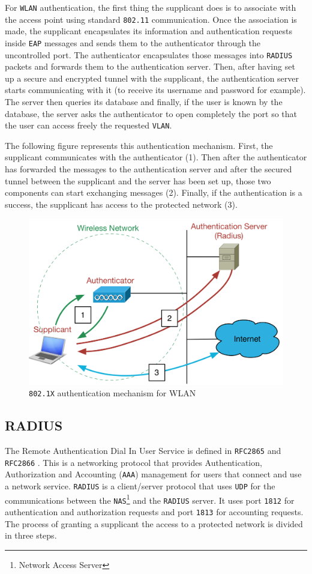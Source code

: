 For \texttt{WLAN} authentication, the first thing the supplicant does is to associate with the access point using standard \texttt{802.11} communication. Once the association is made, the supplicant encapsulates its information and authentication requests inside \texttt{EAP} messages and sends them to the authenticator through the uncontrolled port. The authenticator encapsulates those messages into \texttt{RADIUS} packets and forwards them to the authentication server. Then, after having set up a secure and encrypted tunnel with the supplicant, the authentication server starts communicating with it (to receive its username and password for example). The server then queries its database and finally, if the user is known by the database, the server asks the authenticator to open completely the port so that the user can access freely the requested \texttt{VLAN}.

The following figure represents this authentication mechanism. First, the supplicant communicates with the authenticator (1). Then after the authenticator has forwarded the messages to the authentication server and after the secured tunnel between the supplicant and the server has been set up, those two components can start exchanging messages (2). Finally, if the authentication is a success, the supplicant has access to the protected network (3).

\begin{figure}[H]
	\begin{center}
	\includegraphics[width=.7\linewidth]{Pictures/chapter2/802.png}
	\caption{\texttt{802.1X} authentication mechanism for WLAN}
	\end{center}
\end{figure}


\subsection{RADIUS}
The Remote Authentication Dial In User Service is defined in \texttt{RFC2865} \cite{rfc2865} and \texttt{RFC2866} \cite{rfc2866}. This is a networking protocol that provides Authentication, Authorization and Accounting (\texttt{AAA}) management for users that connect and use a network service. \texttt{RADIUS} is a client/server protocol that uses \texttt{UDP} for the communications between the \texttt{NAS}\footnote{Network Access Server} and the \texttt{RADIUS} server. It uses port \texttt{1812} for authentication and authorization requests and port \texttt{1813} for accounting requests. The process of granting a supplicant the access to a protected network is divided in three steps.

